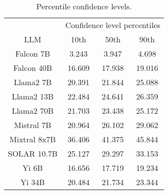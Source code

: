 \begin{table*}
\centering
\begin{tabular}{c|c|c|c}
& \multicolumn{3}{c}{Confidence level percentiles} \\ 
LLM & 10th & 50th & 90th\\ \hline
Falcon 7B & 3.243 & 3.947 & 4.698\\
Falcon 40B & 16.609 & 17.938 & 19.016\\
Llama2 7B & 20.391 & 21.844 & 25.088\\
Llama2 13B & 22.484 & 24.641 & 26.359\\
Llama2 70B & 21.703 & 23.438 & 25.172\\
Mistral 7B & 20.964 & 26.102 & 29.062\\
Mixtral 8x7B & 36.406 & 41.375 & 45.844\\
SOLAR 10.7B & 25.127 & 29.297 & 33.153\\
Yi 6B & 16.656 & 17.719 & 19.234\\
Yi 34B & 20.484 & 21.734 & 23.344\\
\hline
\end{tabular}
\caption{Percentile confidence levels.}
\label{tab:percentile_conf}
\end{table*}
